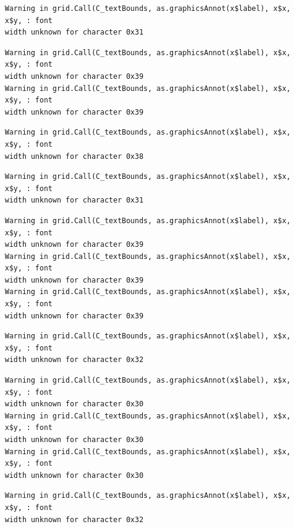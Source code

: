 \documentclass[
  letterpaper,
]{scrbook}
\begin{document}
\begin{verbatim}
Warning in grid.Call(C_textBounds, as.graphicsAnnot(x$label), x$x, x$y, : font
width unknown for character 0x31
\end{verbatim}

\begin{verbatim}
Warning in grid.Call(C_textBounds, as.graphicsAnnot(x$label), x$x, x$y, : font
width unknown for character 0x39
Warning in grid.Call(C_textBounds, as.graphicsAnnot(x$label), x$x, x$y, : font
width unknown for character 0x39
\end{verbatim}

\begin{verbatim}
Warning in grid.Call(C_textBounds, as.graphicsAnnot(x$label), x$x, x$y, : font
width unknown for character 0x38
\end{verbatim}

\begin{verbatim}
Warning in grid.Call(C_textBounds, as.graphicsAnnot(x$label), x$x, x$y, : font
width unknown for character 0x31
\end{verbatim}

\begin{verbatim}
Warning in grid.Call(C_textBounds, as.graphicsAnnot(x$label), x$x, x$y, : font
width unknown for character 0x39
Warning in grid.Call(C_textBounds, as.graphicsAnnot(x$label), x$x, x$y, : font
width unknown for character 0x39
Warning in grid.Call(C_textBounds, as.graphicsAnnot(x$label), x$x, x$y, : font
width unknown for character 0x39
\end{verbatim}

\begin{verbatim}
Warning in grid.Call(C_textBounds, as.graphicsAnnot(x$label), x$x, x$y, : font
width unknown for character 0x32
\end{verbatim}

\begin{verbatim}
Warning in grid.Call(C_textBounds, as.graphicsAnnot(x$label), x$x, x$y, : font
width unknown for character 0x30
Warning in grid.Call(C_textBounds, as.graphicsAnnot(x$label), x$x, x$y, : font
width unknown for character 0x30
Warning in grid.Call(C_textBounds, as.graphicsAnnot(x$label), x$x, x$y, : font
width unknown for character 0x30
\end{verbatim}

\begin{verbatim}
Warning in grid.Call(C_textBounds, as.graphicsAnnot(x$label), x$x, x$y, : font
width unknown for character 0x32
\end{verbatim}
\end{document}
